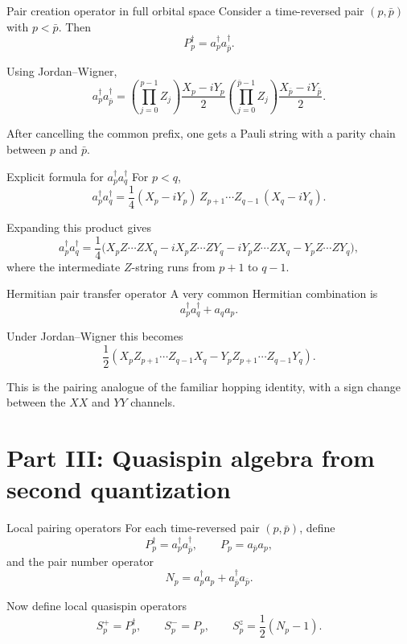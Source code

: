 \documentclass[aspectratio=169]{beamer}
\begin{document}
\begin{frame}{Pair creation operator in full orbital space}
Consider a time-reversed pair \((p,\bar p)\) with \(p<\bar p\).
Then
\[
P_p^\dagger = a_p^\dagger a_{\bar p}^\dagger.
\]

Using Jordan--Wigner,
\[
a_p^\dagger a_{\bar p}^\dagger
=
\left(\prod_{j=0}^{p-1} Z_j\right)\frac{X_p-iY_p}{2}
\left(\prod_{j=0}^{\bar p-1} Z_j\right)\frac{X_{\bar p}-iY_{\bar p}}{2}.
\]

After cancelling the common prefix, one gets a Pauli string with a parity chain between \(p\) and \(\bar p\).
\end{frame}

\begin{frame}{Explicit formula for \(a_p^\dagger a_q^\dagger\)}
For \(p<q\),
\[
a_p^\dagger a_q^\dagger
=
\frac14
(X_p-iY_p)\,
Z_{p+1}\cdots Z_{q-1}\,
(X_q-iY_q).
\]

Expanding this product gives
\[
a_p^\dagger a_q^\dagger
=
\frac14\Big(
X_p Z\cdots Z X_q
- i X_p Z\cdots Z Y_q
- i Y_p Z\cdots Z X_q
- Y_p Z\cdots Z Y_q
\Big),
\]
where the intermediate \(Z\)-string runs from \(p+1\) to \(q-1\).
\end{frame}

\begin{frame}{Hermitian pair transfer operator}
A very common Hermitian combination is
\[
a_p^\dagger a_q^\dagger + a_q a_p.
\]

Under Jordan--Wigner this becomes
\[
\frac12
\left(
X_p Z_{p+1}\cdots Z_{q-1} X_q
-
Y_p Z_{p+1}\cdots Z_{q-1} Y_q
\right).
\]

This is the pairing analogue of the familiar hopping identity, with a sign change between the \(XX\) and \(YY\) channels.
\end{frame}

\section{Part III: Quasispin algebra from second quantization}

\begin{frame}{Local pairing operators}
For each time-reversed pair \((p,\bar p)\), define
\[
P_p^\dagger = a_p^\dagger a_{\bar p}^\dagger,
\qquad
P_p = a_{\bar p} a_p,
\]
and the pair number operator
\[
N_p = a_p^\dagger a_p + a_{\bar p}^\dagger a_{\bar p}.
\]

Now define local quasispin operators
\[
S_p^+ = P_p^\dagger,
\qquad
S_p^- = P_p,
\qquad
S_p^z = \frac12(N_p-1).
\]
\end{frame}
\end{document}
